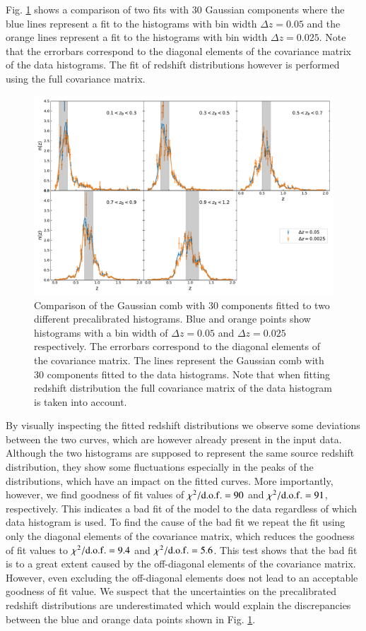 \documentclass{aa}
\begin{document}
\begin{appendix}
Fig. \ref{fig:120vs240} shows a comparison of two fits with 30 Gaussian components where the blue lines represent a fit to the histograms with bin width $\Delta z = 0.05$ and the orange lines represent a fit to the histograms with bin width $\Delta z = 0.025$. Note that the errorbars correspond to the diagonal elements of the covariance matrix of the data histograms. The fit of redshift distributions however is performed using the full covariance matrix.
\begin{figure}
\centering
\includegraphics[width=\linewidth]{plots/calibration_bin_width.pdf}
\caption{Comparison of the Gaussian comb with 30 components fitted to two different precalibrated histograms. Blue and orange points show histograms with a bin width of $\Delta z = 0.05$ and $\Delta z = 0.025$ respectively. The errorbars correspond to the diagonal elements of the covariance matrix. The lines represent the Gaussian comb with 30 components fitted to the data histograms. Note that when fitting redshift distribution the full covariance matrix of the data histogram is taken into account.}
\label{fig:120vs240}
\end{figure}

By visually inspecting the fitted redshift distributions we observe some deviations between the two curves, which are however already present in the input data. Although the two histograms are supposed to represent the same source redshift distribution, they show some fluctuations especially in the peaks of the distributions, which have an impact on the fitted curves. More importantly, however, we find goodness of fit values of $\chi^2/{\rm d.o.f.} = 90$ and $\chi^2/{\rm d.o.f.} = 91$, respectively. This indicates a bad fit of the model to the data regardless of which data histogram is used. To find the cause of the bad fit we repeat the fit using only the diagonal elements of the covariance matrix, which reduces the goodness of fit values to $\chi^2/{\rm d.o.f.} = 9.4$ and $\chi^2/{\rm d.o.f.} = 5.6$. This test shows that the bad fit is to a great extent caused by the off-diagonal elements of the covariance matrix. However, even excluding the off-diagonal elements does not lead to an acceptable goodness of fit value. We suspect that the uncertainties on the precalibrated redshift distributions are underestimated which would explain the discrepancies between the blue and orange data points shown in Fig. \ref{fig:120vs240}.


\end{appendix}
\end{document}

